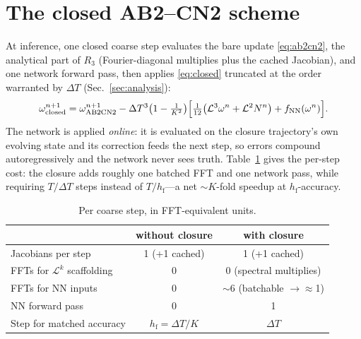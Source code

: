 \documentclass[11pt]{article}
\theoremstyle{plain}
\theoremstyle{definition}
\newcommand{\Lop}{\mathcal{L}}
\newcommand{\DT}{\Delta T}
\newcommand{\hf}{h_{\mathrm{f}}}
\begin{document}
\section{The closed AB2--CN2 scheme}
\label{sec:scheme}
At inference, one closed coarse step evaluates the bare update
\eqref{eq:ab2cn2}, the analytical part of $R_3$ (Fourier-diagonal multiplies
plus the cached Jacobian), and one network forward pass, then applies
\eqref{eq:closed} truncated at the order warranted by $\DT$ (Sec.~\ref{sec:analysis}):
\begin{equation}
\omega^{n+1}_{\rm closed}=\omega^{n+1}_{\rm AB2CN2}
-\DT^3\big(1-\tfrac1{K^2}\big)
\Big[\tfrac1{12}\big(\Lop^3\omega^n+\Lop^2N^n\big)+f_{\rm NN}(\omega^n)\Big].
\end{equation}
The network is applied \emph{online}: it is evaluated on the closure
trajectory's own evolving state and its correction feeds the next step, so
errors compound autoregressively and the network never sees truth.
Table~\ref{tab:cost} gives the per-step cost: the closure adds roughly one
batched FFT and one network pass, while requiring $T/\DT$ steps instead of
$T/\hf$---a net $\sim\!K$-fold speedup at $\hf$-accuracy.
\begin{table}[h]
\centering\small
\caption{Per coarse step, in FFT-equivalent units.}
\label{tab:cost}
\begin{tabular}{lcc}
\toprule
 & without closure & with closure \\
\midrule
Jacobians per step            & 1 (+1 cached) & 1 (+1 cached) \\
FFTs for $\Lop^k$ scaffolding & 0 & 0 (spectral multiplies) \\
FFTs for NN inputs            & 0 & $\sim$6 (batchable $\to\!\approx$1) \\
NN forward pass               & 0 & 1 \\
Step for matched accuracy     & $\hf=\DT/K$ & $\DT$ \\
\bottomrule
\end{tabular}
\end{table}

\end{document}
